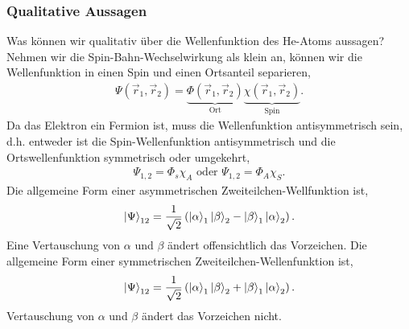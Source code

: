 \subsubsection{Qualitative Aussagen}

Was können wir qualitativ über die Wellenfunktion des He-Atoms aussagen?
Nehmen wir die Spin-Bahn-Wechselwirkung als klein an, können wir die
Wellenfunktion in einen Spin und einen Ortsanteil separieren,
\begin{align*}
\Psi(\vec{r}_1,\vec{r}_2) =
\underbrace{\Phi(\vec{r}_1,\vec{r}_2)}_{\text{Ort}}\underbrace{\chi(\vec{r}_1,\vec{r}_2)}_{\text{Spin}}.
\end{align*}
Da das Elektron ein Fermion ist, muss die Wellenfunktion antisymmetrisch sein,
d.h. entweder ist die Spin-Wellenfunktion antisymmetrisch und die
Ortswellenfunktion symmetrisch oder umgekehrt,
\begin{align*}
\Psi_{1,2} = \Phi_s \chi_A\text{ oder } \Psi_{1,2} = \Phi_A \chi_S.
\end{align*}
Die allgemeine Form einer asymmetrischen Zweiteilchen-Wellfunktion ist,
\begin{align*}
\left|\Psi\right\rangle_{12} = \frac{1}{\sqrt{2}} \left( \left|\alpha\right\rangle_1\left|\beta\right\rangle_2 -
\left|\beta\right\rangle_1\left|\alpha\right\rangle_2\right).
\end{align*}
Eine Vertauschung von $\alpha$ und $\beta$ ändert offensichtlich das
Vorzeichen. Die allgemeine Form einer symmetrischen
Zweiteilchen-Wellenfunktion ist,
\begin{align*}
\left|\Psi\right\rangle_{12} = \frac{1}{\sqrt{2}} \left( \left|\alpha\right\rangle_1\left|\beta\right\rangle_2+
\left|\beta\right\rangle_1\left|\alpha\right\rangle_2\right).
\end{align*}
Vertauschung von $\alpha$ und $\beta$ ändert das Vorzeichen nicht.

